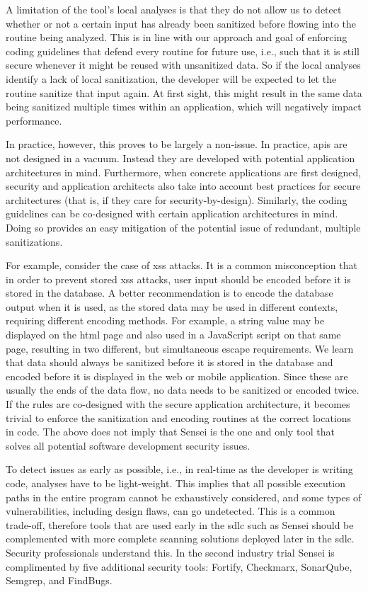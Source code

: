 A limitation of the tool's local analyses is that they do not allow us to detect whether or not a certain input has already been sanitized before flowing into the routine being analyzed.
This is in line with our approach and goal of enforcing coding guidelines that defend every routine for future use, i.e., such that it is still secure whenever it might be reused with unsanitized data.
So if the local analyses identify a lack of local sanitization, the developer will be expected to let the routine sanitize that input again.
At first sight, this might result in the same data being sanitized multiple times within an application, which will negatively impact performance. 

In practice, however, this proves to be largely a non-issue.
In practice, \glspl{api} are not designed in a vacuum.
Instead they are developed with potential application architectures in mind.
Furthermore, when concrete applications are first designed, security and application architects also take into account best practices for secure architectures (that is, if they care for security-by-design).
Similarly, the coding guidelines can be co-designed with certain application architectures in mind.
Doing so provides an easy mitigation of the potential issue of redundant, multiple sanitizations.

For example, consider the case of \gls{xss} attacks.
It is a common misconception that in order to prevent stored \gls{xss} attacks, user input should be encoded before it is stored in the database.
A better recommendation is to encode the database output when it is used, as the stored data may be used in different contexts, requiring different encoding methods.
For example, a string value may be displayed on the \gls{html} page and also used in a JavaScript script on that same page, resulting in two different, but simultaneous escape requirements.
We learn that data should always be sanitized before it is stored in the database and encoded before it is displayed in the web or mobile application.
Since these are usually the ends of the data flow, no data needs to be sanitized or encoded twice.
If the rules are co-designed with the secure application architecture, it becomes trivial to enforce the sanitization and encoding routines at the correct locations in code. 
The above does not imply that Sensei is the one and only tool that solves all potential software development security issues.


To detect issues as early as possible, i.e., in real-time as the developer is writing code, analyses have to be light-weight.
This implies that all possible execution paths in the entire program cannot be exhaustively considered, and some types of vulnerabilities, including design flaws, can go undetected.
This is a common trade-off, therefore tools that are used early in the \gls{sdlc} such as Sensei should be complemented with more complete scanning solutions deployed later in the \gls{sdlc}.
Security professionals understand this.
In the second industry trial Sensei is complimented by five additional security tools: Fortify, Checkmarx, SonarQube, Semgrep, and FindBugs.

